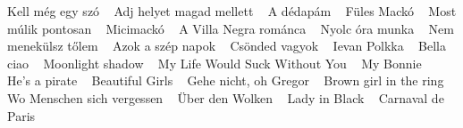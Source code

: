 \footnotesize Kell még egy szó \ \textbf{\pageref{C3A9gegyszC3B3}} \newline
\footnotesize Adj helyet magad mellett \ \textbf{\pageref{yetmagadmellett}} \newline
\footnotesize A dédapám \ \textbf{\pageref{A9dapC3A1m}} \newline
\footnotesize Füles Mackó \ \textbf{\pageref{lesMackC3B3}} \newline
\footnotesize Most múlik pontosan \ \textbf{\pageref{C3BAlikpontosan}} \newline
\footnotesize Micimackó \ \textbf{\pageref{kC3B3}} \newline
\footnotesize A Villa Negra románca \ \textbf{\pageref{NegraromC3A1nca}} \newline
\footnotesize Nyolc óra munka \ \textbf{\pageref{C3B3ramunka}} \newline
\footnotesize Nem menekülsz tőlem \ \textbf{\pageref{ekC3BClsztC591lem}} \newline
\footnotesize Azok a szép napok \ \textbf{\pageref{szC3A9pnapok}} \newline
\footnotesize Csönded vagyok \ \textbf{\pageref{6ndedvagyok}} \newline
\footnotesize Ievan Polkka \ \textbf{\pageref{olkka}} \newline
\footnotesize Bella ciao \ \textbf{\pageref{iao}} \newline
\footnotesize Moonlight shadow \ \textbf{\pageref{htshadow}} \newline
\footnotesize My Life Would Suck Without You \ \textbf{\pageref{WouldSuckWithoutYou}} \newline
\footnotesize My Bonnie \ \textbf{\pageref{ie}} \newline
\footnotesize He's a pirate \ \textbf{\pageref{apirate}} \newline
\footnotesize Beautiful Girls \ \textbf{\pageref{ulGirls}} \newline
\footnotesize Gehe nicht, oh Gregor \ \textbf{\pageref{cht2CohGregor}} \newline
\footnotesize Brown girl in the ring \ \textbf{\pageref{irlinthering}} \newline
\footnotesize Wo Menschen sich vergessen \ \textbf{\pageref{chensichvergessen}} \newline
\footnotesize Über den Wolken \ \textbf{\pageref{erdenWolken}} \newline
\footnotesize Lady in Black \ \textbf{\pageref{Black}} \newline
\footnotesize Carnaval de Paris \ \textbf{\pageref{ldeParis}} \newline
